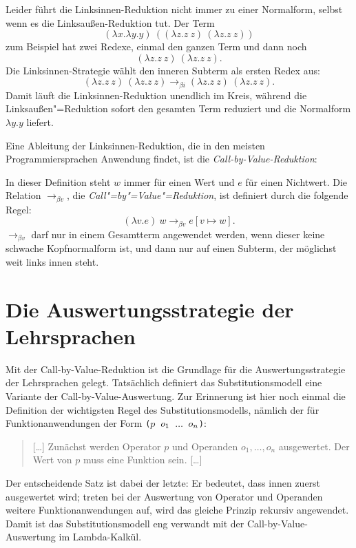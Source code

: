 %
Leider führt die Linksinnen-Reduktion nicht immer zu einer Normalform,
selbst wenn es die Linksaußen-Reduktion tut.  Der Term
\[ (\lambda x.\lambda y.y)~((\lambda z.z~z)~(\lambda z.z~z)) \]
zum Beispiel hat zwei Redexe, einmal den ganzen Term und dann noch
\[(\lambda z.z~z)~(\lambda z.z~z).\]  Die Linksinnen-Strategie wählt
den inneren Subterm als ersten Redex aus:
%
\begin{displaymath}
  (\lambda z.z~z)~(\lambda z.z~z)
\rightarrow_{\beta i}
  (\lambda z.z~z)~(\lambda z.z~z).
\end{displaymath}
%
Damit läuft die Linksinnen-Reduktion unendlich im Kreis, während
die Linksaußen"=Reduktion sofort den gesamten Term reduziert und die
Normalform $\lambda y.y$ liefert.

Eine Ableitung der Linksinnen-Reduktion, die in den meisten
Programmiersprachen Anwendung findet, ist die
\textit{Call-by-Value-Reduktion}:
%
\begin{definition}\label{def:call-by-value}
  In dieser Definition steht $w$ immer für einen Wert und $e$ für
  einen Nichtwert.  Die Relation $\rightarrow_{\beta v}$, die
  \textit{Call"=by"=Value"=Reduktion}, ist definiert durch die
  folgende Regel:
  \begin{displaymath}
    (\lambda v.e)~w \rightarrow_{\beta v} e[v \mapsto w].
  \end{displaymath}
  $\rightarrow_{\beta v}$ darf nur in einem Gesamtterm angewendet
  werden, wenn dieser keine schwache Kopfnormalform ist,
  und dann nur auf einen Subterm, der möglichst weit links innen steht.
\end{definition}

\section{Die Auswertungsstrategie der Lehrsprachen}
\label{sec:scheme-auswertung}

Mit der Call-by-Value-Reduktion ist die Grundlage für die
Auswertungsstrategie der Lehrsprachen gelegt.  Tatsächlich definiert das
Substitutionsmodell eine Variante der
Call-by-Value-Auswertung.  Zur Erinnerung ist hier noch einmal die
Definition der wichtigsten Regel des Substitutionsmodells, nämlich der für
Funktionanwendungen der Form \texttt{(\(p\) \(o\sb{1}\) \(\ldots\) \(o\sb{n}\))}:
%
\begin{quote}
  [\ldots] Zunächst werden Operator $p$ und Operanden $o_1, \ldots, o_n$
  ausgewertet.  Der Wert von $p$ muss eine Funktion sein. [\ldots]
\end{quote}
%
Der entscheidende Satz ist dabei der letzte:
Er bedeutet, dass innen zuerst ausgewertet wird;
treten bei der Auswertung von Operator und Operanden weitere
Funktionanwendungen auf, wird das gleiche Prinzip rekursiv angewendet.
Damit ist das Substitutionsmodell eng verwandt mit der
Call-by-Value-Auswertung im Lambda-Kalkül.

